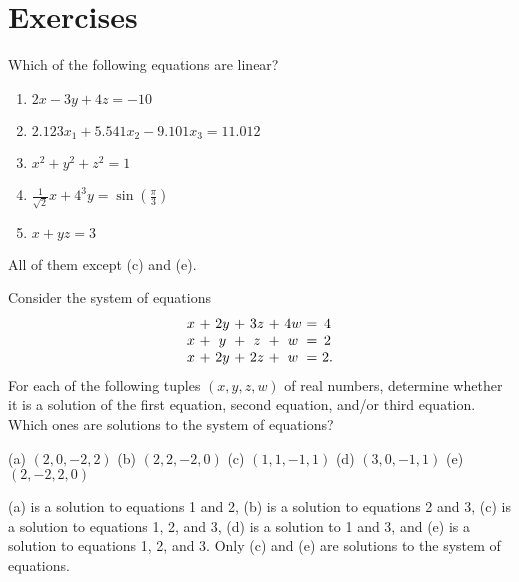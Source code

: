 \section*{Exercises}

\begin{ex}
  Which of the following equations are linear?
  \begin{enumerate}
  \item[(a)] $2x-3y+4z = -10$
  \item[(b)] $2.123x_1 + 5.541x_2 - 9.101x_3 = 11.012$
  \item[(c)] $x^2+y^2+z^2 = 1$
  \item[(d)] $\frac{1}{\sqrt{2}}x+4^3y = \sin(\frac{\pi}{3})$
  \item[(e)] $x+yz = 3$
  \end{enumerate}

  \begin{sol}
    All of them except (c) and (e).
  \end{sol}
\end{ex}

\begin{ex}
  Consider the system of equations
  \begin{equation*}
    \begin{array}{c@{~}c@{~}c@{~}c@{~}c@{~}c@{~}c@{~}c@{~}c}
      x&+&2y&+&3z&+&4w &=& 4 \\
      x&+&y&+&z&+&w &=& 2 \\
      x&+&2y&+&2z&+&w &=& 2.
    \end{array}
  \end{equation*}
  For each of the following tuples $(x,y,z,w)$ of real numbers,
  determine whether it is a solution of the first equation, second
  equation, and/or third equation. Which ones are solutions to the
  system of equations?

  \begin{center}
    (a) $(2,0,-2,2)$ \quad
    (b) $(2,2,-2,0)$ \quad
    (c) $(1,1,-1,1)$ \quad
    (d) $(3,0,-1,1)$ \quad
    (e) $(2,-2,2,0)$
  \end{center}

  \begin{sol}
    (a) is a solution to equations 1 and 2, (b) is a solution to
    equations 2 and 3, (c) is a solution to equations 1, 2, and 3,
    (d) is a solution to 1 and 3, and (e) is a solution to equations
    1, 2, and 3. Only (c) and (e) are solutions to the system of
    equations.
  \end{sol}
\end{ex}

